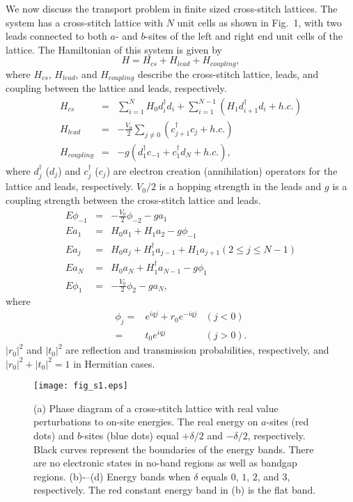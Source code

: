 \documentclass[report,epsfig,pre]{revtex4}
\newcommand{\figsizeone}{0.48}
\begin{document}
We now discuss the transport problem in finite sized cross-stitch lattices.
The system has a cross-stitch lattice with $N$ unit cells as shown in Fig.~1, with two leads connected to both $a$- and $b$-sites of the left and right end unit cells of the lattice.
The Hamiltonian of this system is given by
\begin{equation}
 H = H_{cs} + H_{lead} + H_{coupling},
\label{fb_trans2}
\end{equation}
where $H_{cs}$, $H_{lead}$, and $H_{coupling}$ describe the cross-stitch lattice, leads, and coupling between the lattice and leads, respectively.
\begin{eqnarray}
 H_{cs} &=& \sum_{i=1}^{N}H_0 d_{i}^{\dagger} d_{i} + \sum_{i=1}^{N-1} (H_{1} d_{i+1}^{\dagger} d_{i} + h.c.) \\
 H_{lead} &=& -\frac{V_0}{2} \sum_{j \neq 0} (c_{j+1}^{\dagger} c_{j} + h.c.) \\
 H_{coupling} &=& -g ( d_{1}^{\dagger} c_{-1} + c_{1}^{\dagger} d_{N} + h.c.), 
\end{eqnarray}
where $d_{j}^{\dagger}$ ($d_{j}$) and $c_{j}^{\dagger}$ ($c_{j}$) are electron creation (annihilation) operators for the lattice and leads, respectively. $V_0 / 2$ is a hopping strength in the leads and $g$ is a coupling strength between the cross-stitch lattice and leads.
\begin{eqnarray}
 E \phi_{-1} &=& -\frac{V_0}{2} \phi_{-2} - g a_{1} \\
 E a_{1} &=& H_{0} a_{1} + H_{1} a_{2} - g \phi_{-1}\\
 E a_{j} &=& H_{0} a_{j} + H_{1}^{\dagger} a_{j-1} + H_{1} a_{j+1} (2 \leq j \leq N-1) \\
 E a_{N} &=& H_{0} a_{N} + H_{1}^{\dagger} a_{N-1} - g \phi_{1} \\
 E \phi_{1} &=& -\frac{V_0}{2} \phi_{2} - g a_{N}, 
\end{eqnarray}
where
\begin{eqnarray}
 \phi_{j} =& e^{i q j} + r_0 e^{-i q j} & (j < 0) \\
          =& t_0 e^{i q j} & (j > 0). 
\end{eqnarray}
$\left|r_0\right|^2$ and $\left|t_0\right|^2$ are reflection and transmission probabilities, respectively, and $\left|r_0\right|^2 + \left|t_0\right|^2 = 1$ in Hermitian cases.


\begin{figure}
\begin{center}
\texttt{[image: fig\_s1.eps]}
\caption{
(a) Phase diagram of a cross-stitch lattice with real value perturbations to on-site energies. The real energy on $a$-sites (red dots) and $b$-sites (blue dots) equal $+ \delta /2$ and $- \delta /2$, respectively. Black curves represent the boundaries of the energy bands. There are no electronic states in no-band regions as well as bandgap regions.
(b)-–(d) Energy bands when $\delta$ equals $0$, $1$, $2$, and $3$, respectively.
The red constant energy band in (b) is the flat band.
}
\label{fig_s1}
\end{center}
\end{figure}
\end{document}
